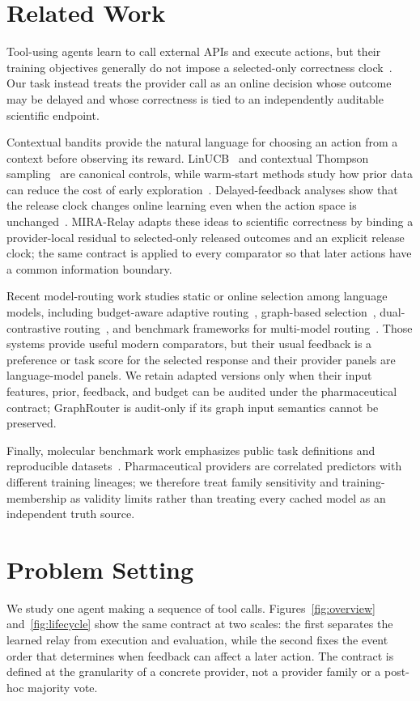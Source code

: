 \documentclass[sigconf,anonymous]{aamas}
\begin{document}
\section{Related Work}
Tool-using agents learn to call external APIs and execute actions, but their training objectives generally do not impose a selected-only correctness clock~\cite{schick2023toolformer,yao2023react}. Our task instead treats the provider call as an online decision whose outcome may be delayed and whose correctness is tied to an independently auditable scientific endpoint.

Contextual bandits provide the natural language for choosing an action from a context before observing its reward. LinUCB~\cite{li2010contextual} and contextual Thompson sampling~\cite{agrawal2013thompson} are canonical controls, while warm-start methods study how prior data can reduce the cost of early exploration~\cite{oetomo2023warmstart}. Delayed-feedback analyses show that the release clock changes online learning even when the action space is unchanged~\cite{joulani2013online}. MIRA-Relay adapts these ideas to scientific correctness by binding a provider-local residual to selected-only released outcomes and an explicit release clock; the same contract is applied to every comparator so that later actions have a common information boundary.

Recent model-routing work studies static or online selection among language models, including budget-aware adaptive routing~\cite{panda2025pilot}, graph-based selection~\cite{feng2025graphrouter}, dual-contrastive routing~\cite{chen2024routerdc}, and benchmark frameworks for multi-model routing~\cite{hu2024routerbench}. Those systems provide useful modern comparators, but their usual feedback is a preference or task score for the selected response and their provider panels are language-model panels. We retain adapted versions only when their input features, prior, feedback, and budget can be audited under the pharmaceutical contract; GraphRouter is audit-only if its graph input semantics cannot be preserved.

Finally, molecular benchmark work emphasizes public task definitions and reproducible datasets~\cite{huang2021tdc,wu2018moleculenet}. Pharmaceutical providers are correlated predictors with different training lineages; we therefore treat family sensitivity and training-membership as validity limits rather than treating every cached model as an independent truth source.

\section{Problem Setting}
We study one agent making a sequence of tool calls. Figures~\ref{fig:overview} and~\ref{fig:lifecycle} show the same contract at two scales: the first separates the learned relay from execution and evaluation, while the second fixes the event order that determines when feedback can affect a later action. The contract is defined at the granularity of a concrete provider, not a provider family or a post-hoc majority vote.
\end{document}
